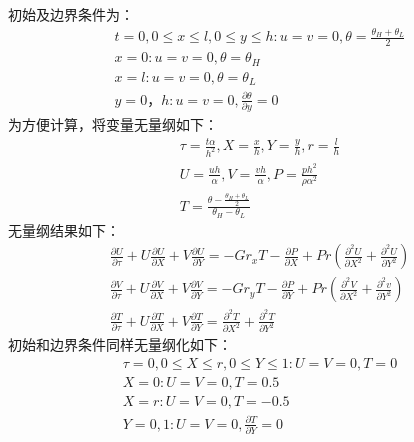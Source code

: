 \documentclass[UTF8]{article} %
\begin{document}
初始及边界条件为：
\begin{gather}
  t=0,0\le x\le l,0\le y\le h:u=v=0,\theta=\frac{\theta_H+\theta_L}{2}\\
  x=0:u=v=0,\theta=\theta_H\\
  x=l:u=v=0,\theta=\theta_L\\
  y=0，h:u=v=0,\frac{\partial \theta}{\partial y}=0
\end{gather}
为方便计算，将变量无量纲如下：
\begin{equation}
  \begin{gathered}
    \tau=\frac{t\alpha}{h^2},X=\frac{x}{h},Y=\frac{y}{h},r=\frac{l}{h}\\
    U=\frac{uh}{\alpha},V=\frac{vh}{\alpha},P=\frac{ph^2}{\rho \alpha^2}\\
    T=\frac{\theta-\frac{\theta_H+\theta_L}{2}}{\theta_H-\theta_L}
  \end{gathered}
\end{equation}
无量纲结果如下：
\begin{gather}
  \frac{\partial U}{\partial \tau} + U \frac{\partial U}{\partial X} + V \frac{\partial U}{\partial Y} = -Gr_x T - \frac{\partial P}{\partial X}+Pr(\frac{\partial^2 U}{\partial X^2}+\frac{\partial^2 U}{\partial Y^2}) \\
  \frac{\partial V}{\partial \tau} + U \frac{\partial V}{\partial X} + V \frac{\partial V}{\partial Y} = -Gr_y T - \frac{\partial P}{\partial Y}+Pr(\frac{\partial^2 V}{\partial X^2}+\frac{\partial^2 v}{\partial Y^2}) \\
  \frac{\partial T}{\partial \tau} + U \frac{\partial T}{\partial X} + V \frac{\partial T}{\partial Y} = \frac{\partial^2 T}{\partial X^2}+\frac{\partial^2 T}{\partial Y^2}
\end{gather}
初始和边界条件同样无量纲化如下：
\begin{gather}
  \tau=0,0\le X\le r,0\le Y\le 1:U=V=0,T=0\\
  X=0:U=V=0,T=0.5\\
  X=r:U=V=0,T=-0.5\\
  Y=0,1:U=V=0,\frac{\partial T}{\partial Y}=0
\end{gather}
\end{document}
